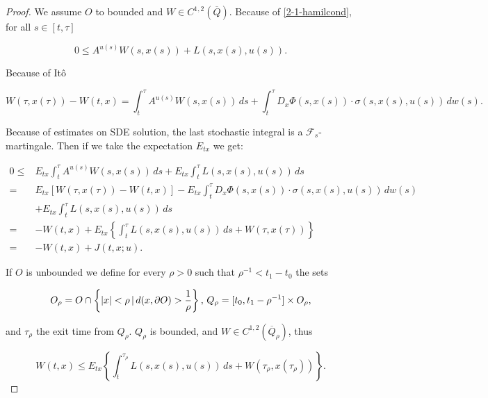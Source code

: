 \begin{theorem}
    \begin{proof}
        We assume $O$ to bounded and $W\in C^{1,2}(\overline{Q})$. Because of \eqref{2-1-hamilcond}, for all $s\in[t,\tau]$

        \begin{equation}\label{2-1-proofver-keyeq}
            0\leq A^{u(s)}W(s,x(s)) + L(s,x(s),u(s)).
        \end{equation}

        Because of It\^o

        \begin{equation*}
            W(\tau,x(\tau)) - W(t,x) = \int_t^{\tau} A^{u(s)}W(s,x(s))\,ds + \int_t^{\tau} D_x\Phi(s,x(s))\cdot \sigma(s,x(s),u(s))\,dw(s).
        \end{equation*}

        Because of estimates on SDE solution, the last stochastic integral is a $\mathcal{F}_s$-martingale. Then if we take the expectation $E_{tx}$ we get:

        \begin{align*}
            0 \leq & E_{tx} \int_t^{\tau}A^{u(s)}W(s,x(s))\,ds + E_{tx}\int_t^{\tau} L(s,x(s),u(s))\,ds \\
            = & E_{tx}\left[W(\tau,x(\tau)) - W(t,x)\right] - E_{tx}\int_t^{\tau} D_x\Phi(s,x(s))\cdot \sigma(s,x(s),u(s))\,dw(s) \\
            & + E_{tx}\int_t^{\tau} L(s,x(s),u(s))\,ds \\
            = & -W(t,x) + E_{tx}\left\{\int_t^{\tau} L(s,x(s),u(s))\,ds + W(\tau,x(\tau))\right\} \\
            = & -W(t,x) + J(t,x;u).
        \end{align*}

        If $O$ is unbounded we define for every $\rho>0$ such that $\rho^{-1}<t_1-t_0$ the sets

        \begin{equation*}
            O_{\rho} = O\cap\left\{\abs{x}<\rho\,|\,d(x,\partial O)>\frac{1}{\rho}\right\},\, Q_{\rho} = [t_0,t_1-\rho^{-1}]\times O_{\rho},
        \end{equation*}

        and $\tau_{\rho}$ the exit time from $Q_{\rho}$. $Q_{\rho}$ is bounded, and $W\in C^{1,2}(\overline{Q}_{\rho})$, thus

        \begin{equation}
            W(t,x) \leq E_{tx}\left\{\int_t^{\tau_{\rho}} L(s,x(s),u(s))\,ds + W(\tau_{\rho},x(\tau_{\rho}))\right\}.
        \end{equation}


\end{proof}
\end{theorem}

